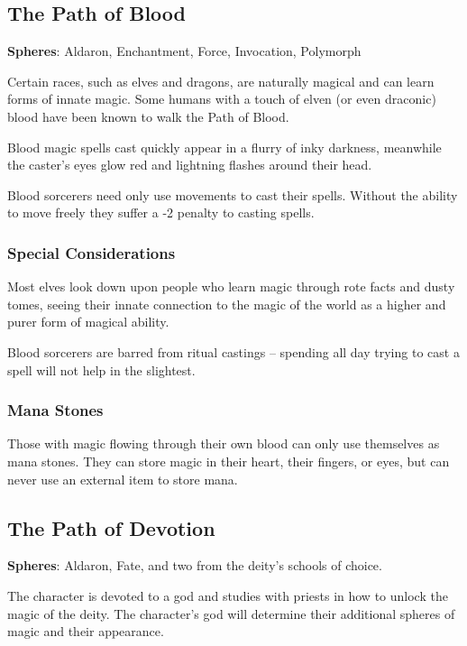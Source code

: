 \begin{multicols}{2}
\subsection{The Path of Blood}

\textbf{Spheres}: Aldaron, Enchantment, Force, Invocation, Polymorph

\noindent Certain races, such as elves and dragons, are naturally magical and can learn forms of innate magic. Some humans with a touch of elven (or even draconic) blood have been known to walk the Path of Blood.

Blood magic spells cast quickly appear in a flurry of inky darkness, meanwhile the caster's eyes glow red and lightning flashes around their head.

Blood sorcerers need only use movements to cast their spells. Without the ability to move freely they suffer a -2 penalty to casting spells.

\subsubsection{Special Considerations}

Most elves look down upon people who learn magic through rote facts and dusty tomes, seeing their innate connection to the magic of the world as a higher and purer form of magical ability.

Blood sorcerers are barred from ritual castings -- spending all day trying to cast a spell will not help in the slightest.

\subsubsection{Mana Stones}

Those with magic flowing through their own blood can only use themselves as mana stones.
They can store magic in their heart, their fingers, or eyes, but can never use an external item to store mana.

\subsection{The Path of Devotion}

\textbf{Spheres}: Aldaron, Fate, and two from the deity's schools of choice.

\noindent The character is devoted to a god and studies with priests in how to unlock the magic of the deity. The character's god will determine their additional spheres of magic and their appearance.


\end{multicols}
